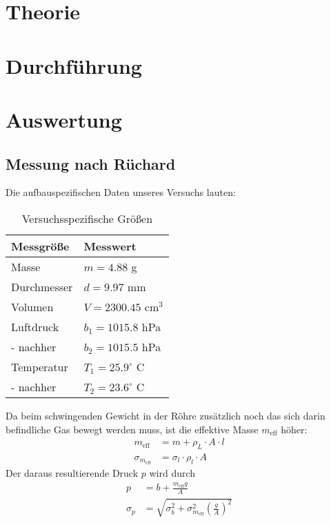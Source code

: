 \documentclass[12pt,a4paper,titlepage,headinclude,bibtotoc]{scrartcl}
\begin{document}
\section{Theorie}
\label{sec:theorie}
                                                                                                                                                                      

\section{Durchführung}
\label{sec:durchfuehrung}


\section{Auswertung}
\label{sec:auswertung}
\subsection{Messung nach Rüchard}
Die aufbauspezifischen Daten unseres Versuchs lauten:
\begin{table}[!h]
	\centering
	\begin{tabular}{|l|l|}
		\hline
		Messgröße	& Messwert\\\hline\hline
		Masse		& $m=4.88$ g\\\hline
		Durchmesser	& $d=9.97$ mm\\\hline
		Volumen		& $V=2300.45$ cm$^3$\\\hline
		Luftdruck	& $b_1=1015.8$ hPa\\
		- nachher	& $b_2=1015.5$ hPa\\\hline
		Temperatur	& $T_1=25.9^\circ$ C\\
		- nachher	& $T_2=23.6^\circ$ C\\\hline
	\end{tabular}
	\caption{Versuchsspezifische Größen}
	\label{tab:versgr}
\end{table}
Da beim schwingenden Gewicht in der Röhre zusätzlich noch das sich darin befindliche Gas bewegt werden muss, ist die effektive Masse $m_\text{eff}$ höher:
\begin{align*}
	m_\text{eff}&=m+\rho_L \cdot A\cdot l\\
	\sigma_{m_\text{eff}}&=\sigma_l\cdot \rho_l \cdot A
\end{align*}
Der daraus resultierende Druck $p$ wird durch
\begin{align*}
	p&=b+\frac{m_\text{eff}g}{A}\\
	\sigma_p&=\sqrt{\sigma_b^2+\sigma_{m_\text{eff}}^2\left(\frac{g}{A}\right)^2}
\end{align*}
\end{document}
